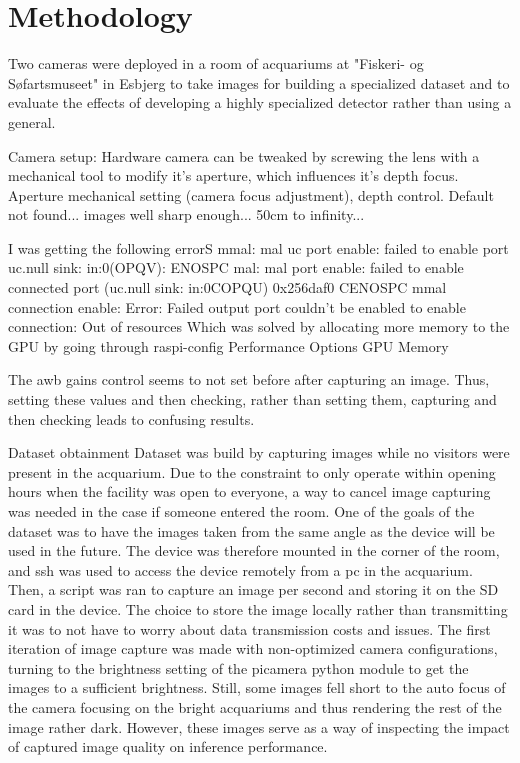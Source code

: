 \section{Methodology}
Two cameras were deployed in a room of acquariums at "Fiskeri- og Søfartsmuseet" in Esbjerg to take images for building a specialized dataset and to evaluate the effects of developing a highly specialized detector rather than using a general.

Camera setup:
Hardware camera can be tweaked by screwing the lens with a mechanical tool to modify it's aperture, which influences it's depth focus. 
Aperture mechanical setting (camera focus adjustment), depth control. Default not found... images well sharp enough... 50cm to infinity...

I was getting the following errorS
mmal:
mal uc port enable: failed to enable port
uc.null sink: in:0(OPQV): ENOSPC
mal: mal port enable: failed to enable connected
port (uc.null sink: in:0COPQU) 0x256daf0 CENOSPC
mmal connection enable:
Error: Failed
output port couldn't be enabled
to enable connection: Out of resources
Which was solved by allocating more memory to the GPU by going through raspi-config Performance Options  GPU Memory

The awb gains control seems to not set before after capturing an image. Thus, setting these values and then checking, rather than setting them, capturing and then checking leads to confusing results.

Dataset obtainment
Dataset was build by capturing images while no visitors were present in the acquarium. Due to the constraint to only operate within opening hours when the facility was open to everyone, a way to cancel image capturing was needed in the case if someone entered the room. One of the goals of the dataset was to have the images taken from the same angle as the device will be used in the future. The device was therefore mounted in the corner of the room, and ssh was used to access the device remotely from a pc in the acquarium. Then, a script was ran to capture an image per second and storing it on the SD card in the device. The choice to store the image locally rather than transmitting it was to not have to worry about data transmission costs and issues. The first iteration of image capture was made with non-optimized camera configurations, turning to the brightness setting of the picamera python module to get the images to a sufficient brightness. Still, some images fell short to the auto focus of the camera focusing on the bright acquariums and thus rendering the rest of the image rather dark. However, these images serve as a way of inspecting the impact of captured image quality on inference performance. 

